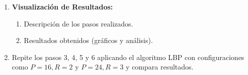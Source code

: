 \begin{enumerate}
\begin{enumerate}
              \item Divide los datos en entrenamiento (70\%) y prueba (30\%).
              \item Usa un modelo simple como vecinos más cercanos (k-NN) o Máquina de Soporte Vectorial
                    (SVM) sobre los vectores de características y entrena el modelo.
              \item Calcula la exactitud en el conjunto de prueba.
              \item Visualiza las imágenes LBP para entender qué patrones se están detectando.
              \item Mostrar matriz de confusión.
          \end{enumerate}
    \item \textbf{Visualización de Resultados:}
          \begin{enumerate}
              \item Descripción de los pasos realizados.
              \item Resultados obtenidos (gráficos y análisis).
          \end{enumerate}
    \item Repite los pasos 3, 4, 5 y 6 aplicando el algoritmo LBP con configuraciones como
          $P=16, R=2$ y $P=24, R=3$ y compara resultados.
\end{enumerate}